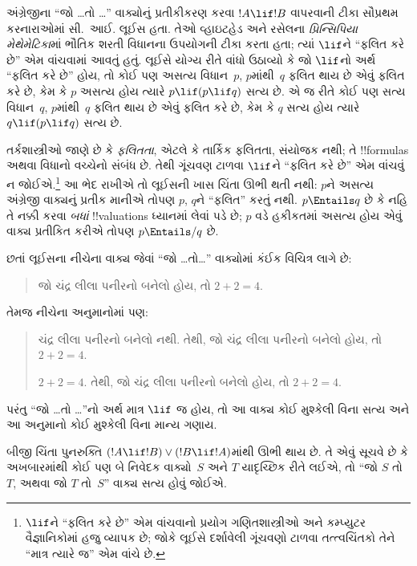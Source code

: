 \documentclass[../../../include/open-logic-section]{subfiles}
\begin{document}


અંગ્રેજીના ``જો \dots તો \dots'' વાક્યોનું પ્રતીકીકરણ કરવા
$!A \lif !B$ વાપરવાની ટીકા સૌપ્રથમ કરનારાઓમાં સી.~આઈ. લૂઈસ હતા.
તેઓ વ્હાઇટહેડ અને રસેલના \emph{પ્રિન્સિપિયા મેથેમેટિકા}માં ભૌતિક
શરતી વિધાનના ઉપયોગની ટીકા કરતા હતા; ત્યાં $\lif$ને ``ફલિત કરે છે''
એમ વાંચવામાં આવતું હતું. લૂઈસે યોગ્ય રીતે વાંધો ઉઠાવ્યો કે જો
$\lif$નો અર્થ ``ફલિત કરે છે'' હોય, તો કોઈ પણ અસત્ય વિધાન~$p$,
$p$માંથી~$q$ ફલિત થાય છે એવું ફલિત કરે છે, કેમ કે $p$ અસત્ય હોય
ત્યારે $p \lif (p \lif q)$ સત્ય છે. એ જ રીતે કોઈ પણ સત્ય વિધાન~$q$,
$p$માંથી~$q$ ફલિત થાય છે એવું ફલિત કરે છે, કેમ કે $q$ સત્ય હોય
ત્યારે $q \lif (p \lif q)$ સત્ય છે.

તર્કશાસ્ત્રીઓ જાણે છે કે \emph{ફલિતતા}, એટલે કે તાર્કિક ફલિતતા,
સંયોજક નથી; તે !!{formula}s અથવા વિધાનો વચ્ચેનો સંબંધ છે. તેથી
ગૂંચવણ ટાળવા $\lif$ને ``ફલિત કરે છે'' એમ વાંચવું ન જોઈએ.\footnote{$\lif$ને
  ``ફલિત કરે છે'' એમ વાંચવાનો પ્રયોગ ગણિતશાસ્ત્રીઓ અને કમ્પ્યુટર
  વૈજ્ઞાનિકોમાં હજુ વ્યાપક છે; જોકે લૂઈસે દર્શાવેલી ગૂંચવણો ટાળવા
  તત્ત્વચિંતકો તેને ``માત્ર ત્યારે જ'' એમ વાંચે છે.} આ ભેદ રાખીએ
તો લૂઈસની ખાસ ચિંતા ઊભી થતી નથી: $p$ને અસત્ય અંગ્રેજી વાક્યનું
પ્રતીક માનીએ તોપણ $p$, $q$ને ``ફલિત'' કરતું નથી. $p \Entails q$
છે કે નહિ તે નક્કી કરવા \emph{બધાં} !!{valuation}s ધ્યાનમાં લેવાં પડે
છે; $p$ વડે હકીકતમાં અસત્ય હોય એવું વાક્ય પ્રતીકિત કરીએ તોપણ
$p \Entails/ q$ છે.

છતાં લૂઈસના નીચેના વાક્ય જેવાં ``જો \dots તો\dots'' વાક્યોમાં
કંઈક વિચિત્ર લાગે છે:
\begin{quote}
જો ચંદ્ર લીલા પનીરનો બનેલો હોય, તો $2+2=4$.
\end{quote}
તેમજ નીચેના અનુમાનોમાં પણ:
\begin{quote}
  ચંદ્ર લીલા પનીરનો બનેલો નથી. તેથી, જો ચંદ્ર લીલા પનીરનો બનેલો
  હોય, તો $2+2=4$.

  $2+2 = 4$. તેથી, જો ચંદ્ર લીલા
  પનીરનો બનેલો હોય, તો $2+2=4$.
\end{quote}
પરંતુ ``જો \dots તો \dots''નો અર્થ માત્ર $\lif$ જ હોય, તો આ વાક્ય
કોઈ મુશ્કેલી વિના સત્ય અને આ અનુમાનો કોઈ મુશ્કેલી વિના માન્ય ગણાય.

બીજી ચિંતા પુનરુક્તિ $(!A \lif !B) \lor (!B \lif
!A)$માંથી ઊભી થાય છે. તે એવું સૂચવે છે કે અખબારમાંથી કોઈ પણ બે
નિવેદક વાક્યો~$S$ અને $T$ યાદૃચ્છિક રીતે લઈએ, તો ``જો $S$ તો
$T$, અથવા જો $T$ તો~$S$'' વાક્ય સત્ય હોવું જોઈએ.
\end{document}
